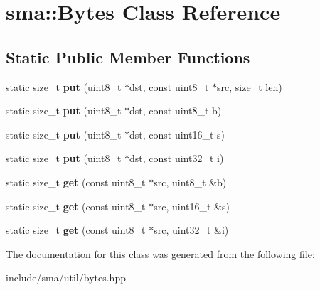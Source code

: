 \hypertarget{classsma_1_1Bytes}{\section{sma\-:\-:Bytes Class Reference}
\label{classsma_1_1Bytes}
}
\subsection*{Static Public Member Functions}
\begin{DoxyCompactItemize}
\item 
\hypertarget{classsma_1_1Bytes_a841e80738b98c0dbc86af2494bbc70d8}{static size\-\_\-t {\bfseries put} (uint8\-\_\-t $\ast$dst, const uint8\-\_\-t $\ast$src, size\-\_\-t len)}\label{classsma_1_1Bytes_a841e80738b98c0dbc86af2494bbc70d8}

\item 
\hypertarget{classsma_1_1Bytes_ae5b6a19877e5fc784a3da03cff3a8640}{static size\-\_\-t {\bfseries put} (uint8\-\_\-t $\ast$dst, const uint8\-\_\-t b)}\label{classsma_1_1Bytes_ae5b6a19877e5fc784a3da03cff3a8640}

\item 
\hypertarget{classsma_1_1Bytes_a21dac037bafc4351e3bfe1eb7c8bea7f}{static size\-\_\-t {\bfseries put} (uint8\-\_\-t $\ast$dst, const uint16\-\_\-t s)}\label{classsma_1_1Bytes_a21dac037bafc4351e3bfe1eb7c8bea7f}

\item 
\hypertarget{classsma_1_1Bytes_a834cafc63eb0a396d07c11cca4c5dc29}{static size\-\_\-t {\bfseries put} (uint8\-\_\-t $\ast$dst, const uint32\-\_\-t i)}\label{classsma_1_1Bytes_a834cafc63eb0a396d07c11cca4c5dc29}

\item 
\hypertarget{classsma_1_1Bytes_a0191a7143826b51481889e1d49ae4f20}{static size\-\_\-t {\bfseries get} (const uint8\-\_\-t $\ast$src, uint8\-\_\-t \&b)}\label{classsma_1_1Bytes_a0191a7143826b51481889e1d49ae4f20}

\item 
\hypertarget{classsma_1_1Bytes_ac9b59a33bd36fb405fb593e8ad51b3d6}{static size\-\_\-t {\bfseries get} (const uint8\-\_\-t $\ast$src, uint16\-\_\-t \&s)}\label{classsma_1_1Bytes_ac9b59a33bd36fb405fb593e8ad51b3d6}

\item 
\hypertarget{classsma_1_1Bytes_a5953d9e30c8f9a78ef8521ce7f5f51bc}{static size\-\_\-t {\bfseries get} (const uint8\-\_\-t $\ast$src, uint32\-\_\-t \&i)}\label{classsma_1_1Bytes_a5953d9e30c8f9a78ef8521ce7f5f51bc}

\end{DoxyCompactItemize}


The documentation for this class was generated from the following file\-:\begin{DoxyCompactItemize}
\item 
include/sma/util/bytes.\-hpp\end{DoxyCompactItemize}
